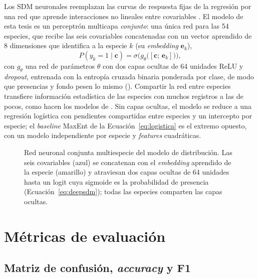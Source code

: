 Los SDM neuronales reemplazan las curvas de respuesta fijas de la regresión
por una red que aprende interacciones no lineales entre covariables
\citep{botella2018deepsdm, deneu2021cnn}. El modelo de esta tesis es un
perceptrón multicapa \emph{conjunto}: una única red para las 54 especies,
que recibe las seis covariables concatenadas con un vector aprendido de 8
dimensiones que identifica a la especie $k$ (su \textit{embedding}
$\mathbf{e}_k$),
\begin{equation}
  P(y_k = 1 \mid \mathbf{c}) = \sigma\!\Big( g_\theta\big([\mathbf{c};\, \mathbf{e}_k]\big) \Big),
  \label{eq:deepsdm}
\end{equation}
con $g_\theta$ una red de parámetros $\theta$ con dos capas ocultas de 64
unidades ReLU y \textit{dropout}, entrenada con la entropía cruzada binaria
ponderada por clase, de modo que presencias y fondo pesen lo mismo
(). Compartir
la red entre especies transfiere información estadística de las especies
con muchos registros a las de pocos, como hacen los modelos de
\citet{cole2023sinr}. Sin capas ocultas, el modelo se reduce a una regresión logística con
pendientes compartidas entre especies y un intercepto por especie; el
\textit{baseline} MaxEnt de la Ecuación~\ref{eq:logistica} es el extremo
opuesto, con un modelo independiente por especie y \textit{features}
cuadráticas.

\begin{figure}[!htb]
  \centering
  \caption{Red neuronal conjunta multiespecie del modelo de distribución.
  Las seis covariables (azul) se concatenan con el \textit{embedding}
  aprendido de la especie (amarillo) y atraviesan dos capas ocultas de 64
  unidades hasta un logit cuya sigmoide es la probabilidad de presencia
  (Ecuación~\ref{eq:deepsdm}); todas las especies comparten las capas
  ocultas.}
  \label{fig:mlp-sdm}
\end{figure}

\section{Métricas de evaluación}\label{sec:teoria-metricas}

\subsection{Matriz de confusión, \textit{accuracy} y F1}

